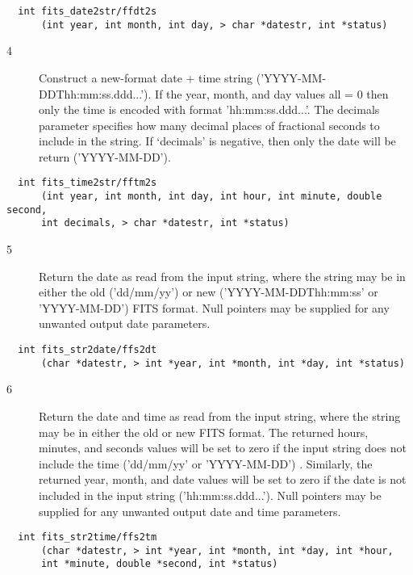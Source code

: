 \documentclass[11pt]{book}
\begin{document}
\begin{verbatim}
  int fits_date2str/ffdt2s
      (int year, int month, int day, > char *datestr, int *status)
\end{verbatim}


\begin{description}
\item[4 ] Construct a new-format date + time string ('YYYY-MM-DDThh:mm:ss.ddd...').
  If the year, month, and day values all = 0 then only the time is encoded
  with format 'hh:mm:ss.ddd...'.  The decimals parameter specifies how many
  decimal places of fractional seconds to include in the string.  If `decimals'
 is negative, then only the date will be return ('YYYY-MM-DD').
\end{description}

\begin{verbatim}
  int fits_time2str/fftm2s
      (int year, int month, int day, int hour, int minute, double second,
      int decimals, > char *datestr, int *status)
\end{verbatim}


\begin{description}
\item[5 ] Return the date as read from the input string, where the string may be
in either the old ('dd/mm/yy')  or new ('YYYY-MM-DDThh:mm:ss' or
'YYYY-MM-DD') FITS format.  Null pointers may be supplied for any
  unwanted output date parameters.
\end{description}

\begin{verbatim}
  int fits_str2date/ffs2dt
      (char *datestr, > int *year, int *month, int *day, int *status)
\end{verbatim}


\begin{description}
\item[6 ] Return the date and time as read from the input string, where the
string may be in either the old  or new FITS format.  The returned hours,
minutes, and seconds values will be set to zero if the input string
does not include the time ('dd/mm/yy' or 'YYYY-MM-DD') .  Similarly,
the returned year, month, and date values will be set to zero if the
date is not included in the input string ('hh:mm:ss.ddd...').  Null
pointers may be supplied for any unwanted output date and time
parameters.
\end{description}

\begin{verbatim}
  int fits_str2time/ffs2tm
      (char *datestr, > int *year, int *month, int *day, int *hour,
      int *minute, double *second, int *status)
\end{verbatim}
\end{document}
